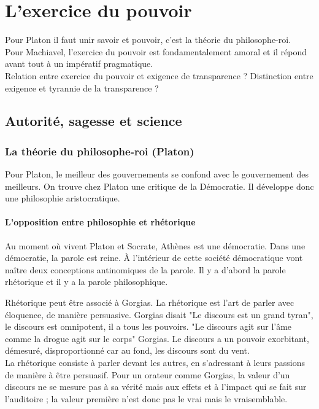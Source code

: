 \documentclass[10pt, a4paper, openany]{book}
\begin{document}
\chapter{L'exercice du pouvoir}

Pour Platon il faut unir savoir et pouvoir, c'est la théorie du philosophe-roi. \\
Pour Machiavel, l'exercice du pouvoir est fondamentalement amoral et il répond avant tout à un impératif pragmatique. \\
Relation entre exercice du pouvoir et exigence de transparence ? Distinction entre exigence et tyrannie de la transparence ?

\section{Autorité, sagesse et science}

\subsection{La théorie du philosophe-roi (Platon)}

Pour Platon, le meilleur des gouvernements se confond avec le gouvernement des meilleurs. On trouve chez Platon une critique de la Démocratie. Il développe donc une philosophie aristocratique. 

\subsubsection{L'opposition entre philosophie et rhétorique}

Au moment où vivent Platon et Socrate, Athènes est une démocratie. Dans une démocratie, la parole est reine. À l'intérieur de cette société démocratique vont naître deux conceptions antinomiques de la parole. Il y a d'abord la parole rhétorique et il y a la parole philosophique.


Rhétorique peut être associé à Gorgias. La rhétorique est l'art de parler avec éloquence, de manière persuasive. Gorgias disait "Le discours est un grand tyran", le discours est omnipotent, il a tous les pouvoirs. "Le discours agit sur l'âme comme la drogue agit sur le corps" Gorgias. Le discours a un pouvoir exorbitant, démesuré, disproportionné car au fond, les discours sont du vent. \\
La rhétorique consiste à parler devant les autres, en s'adressant à leurs passions de manière à être persuasif. Pour un orateur comme Gorgias, la valeur d'un discours ne se mesure pas à sa vérité mais aux effets et à l'impact qui se fait sur l'auditoire ; la valeur première n'est donc pas le vrai mais le vraisemblable. 
\end{document}
